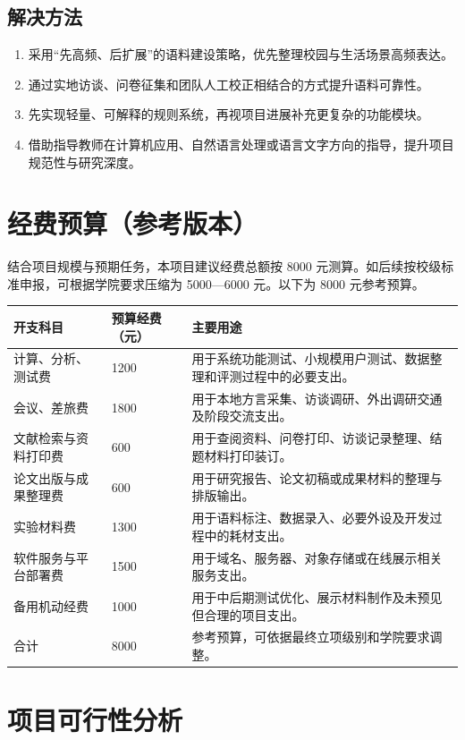 \documentclass[12pt,a4paper]{ctexart}
\begin{document}
\subsection{解决方法}

\begin{enumerate}
  \item 采用“先高频、后扩展”的语料建设策略，优先整理校园与生活场景高频表达。
  \item 通过实地访谈、问卷征集和团队人工校正相结合的方式提升语料可靠性。
  \item 先实现轻量、可解释的规则系统，再视项目进展补充更复杂的功能模块。
  \item 借助指导教师在计算机应用、自然语言处理或语言文字方向的指导，提升项目规范性与研究深度。
\end{enumerate}

\section{经费预算（参考版本）}

结合项目规模与预期任务，本项目建议经费总额按 8000 元测算。如后续按校级标准申报，可根据学院要求压缩为 5000—6000 元。以下为 8000 元参考预算。

\begin{longtable}{p{4.2cm}p{2.4cm}p{7.4cm}}
\toprule
开支科目 & 预算经费（元） & 主要用途 \\
\midrule
计算、分析、测试费 & 1200 & 用于系统功能测试、小规模用户测试、数据整理和评测过程中的必要支出。 \\
会议、差旅费 & 1800 & 用于本地方言采集、访谈调研、外出调研交通及阶段交流支出。 \\
文献检索与资料打印费 & 600 & 用于查阅资料、问卷打印、访谈记录整理、结题材料打印装订。 \\
论文出版与成果整理费 & 600 & 用于研究报告、论文初稿或成果材料的整理与排版输出。 \\
实验材料费 & 1300 & 用于语料标注、数据录入、必要外设及开发过程中的耗材支出。 \\
软件服务与平台部署费 & 1500 & 用于域名、服务器、对象存储或在线展示相关服务支出。 \\
备用机动经费 & 1000 & 用于中后期测试优化、展示材料制作及未预见但合理的项目支出。 \\
\midrule
合计 & 8000 & 参考预算，可依据最终立项级别和学院要求调整。 \\
\bottomrule
\end{longtable}

\section{项目可行性分析}
\end{document}
